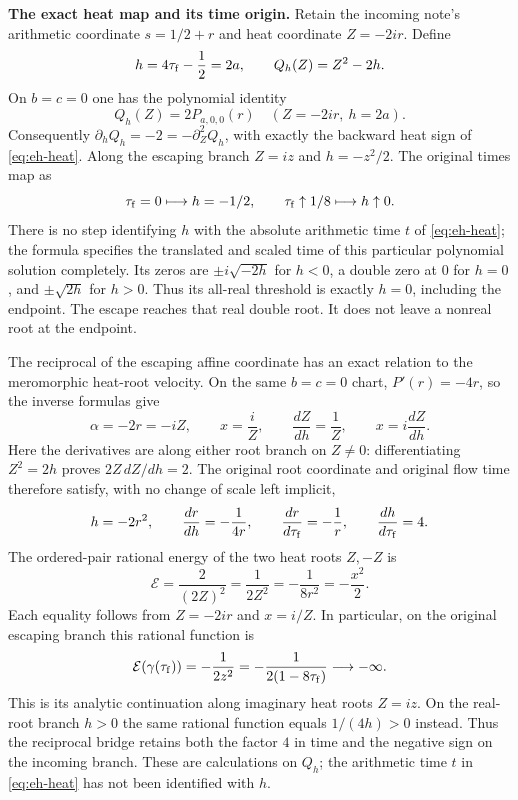 \EH\textbf{The exact heat map and its time origin.}
Retain the incoming note's arithmetic coordinate
$s=1/2+r$ and heat coordinate $Z=-2ir$. Define
\[
 h=4\tau_{\rm f}-\frac12=2a,\qquad
 Q_h(Z)=Z^2-2h.
\]
On $b=c=0$ one has the polynomial identity
\[
 Q_h(Z)=2P_{a,0,0}(r)\quad (Z=-2ir,\ h=2a).
\]
Consequently $\partial_hQ_h=-2=-\partial_Z^2Q_h$, with exactly the
backward heat sign of \eqref{eq:eh-heat}. Along the escaping branch
$Z=iz$ and $h=-z^2/2$. The original times map as
\[
 \tau_{\rm f}=0\longmapsto h=-1/2,\qquad
 \tau_{\rm f}\uparrow1/8\longmapsto h\uparrow0.
\]
There is no step identifying $h$ with the absolute arithmetic time $t$
of \eqref{eq:eh-heat}; the formula specifies the translated and scaled
time of this particular polynomial solution completely.
Its zeros are $\pm i\sqrt{-2h}$ for $h<0$, a double zero at $0$ for
$h=0$, and $\pm\sqrt{2h}$ for $h>0$. Thus its all-real threshold is
exactly $h=0$, including the endpoint. The escape reaches that real
double root. It does not leave a nonreal root at the endpoint.

The reciprocal of the escaping affine coordinate has an exact relation
to the meromorphic heat-root velocity. On the same $b=c=0$ chart,
$P'(r)=-4r$, so the inverse formulas give
\begin{equation}
 \alpha=-2r=-iZ,\qquad x=\frac{i}{Z},\qquad
 \frac{dZ}{dh}=\frac1Z,\qquad
 x=i\frac{dZ}{dh}.
 \label{eq:eh-reciprocal-bridge}
\end{equation}
Here the derivatives are along either root branch on $Z\ne0$:
differentiating $Z^2=2h$ proves $2Z\,dZ/dh=2$. The original root
coordinate and original flow time therefore satisfy, with no change
of scale left implicit,
\begin{equation}
 h=-2r^2,\qquad \frac{dr}{dh}=-\frac1{4r},\qquad
 \frac{dr}{d\tau_{\rm f}}=-\frac1r,
 \qquad \frac{dh}{d\tau_{\rm f}}=4.
 \label{eq:eh-original-reciprocal}
\end{equation}
The ordered-pair rational energy of the two heat roots $Z,-Z$ is
\begin{equation}
 \mathcal E=\frac{2}{(2Z)^2}
 =\frac1{2Z^2}=-\frac1{8r^2}=-\frac{x^2}{2}.
 \label{eq:eh-energy-coordinates}
\end{equation}
Each equality follows from $Z=-2ir$ and $x=i/Z$. In particular, on
the original escaping branch this rational function is
\begin{equation}
 \mathcal E(\gamma(\tau_{\rm f}))
 =-\frac1{2z^2}=-\frac1{2(1-8\tau_{\rm f})}
 \longrightarrow-\infty.
 \label{eq:eh-incoming-energy}
\end{equation}
This is its analytic continuation along imaginary heat roots $Z=iz$.
On the real-root branch $h>0$ the same rational function equals
$1/(4h)>0$ instead. Thus the reciprocal bridge retains both the
factor $4$ in time and the negative sign on the incoming branch.
These are calculations on $Q_h$; the arithmetic time $t$ in
\eqref{eq:eh-heat} has not been identified with $h$.

